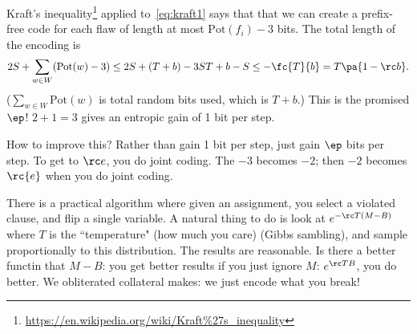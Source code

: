Kraft's inequality\footnote{\url{https://en.wikipedia.org/wiki/Kraft\%27s_inequality}} applied to~\eqref{eq:kraft1} says that that we can create a prefix-free code for each flaw of length at most $\text{Pot}(f_i)-3$ bits. The total length of the encoding is
\[
2S + \sum_{w\in W} (\text{Pot}(w)-3) \le 2S+(T+b)-3S
T+b-S \le -\fc{T}{b} = T\pa{1-\rc b}.
\]
($\sum_{w\in W}\text{Pot}(w)$ is total random bits used, which is $T+b$.)
This is the promised $\ep$! $2+1=3$ gives an entropic gain of 1 bit per step.


How to improve this? Rather than gain 1 bit per step, just gain $\ep$ bits per step. To get to $\rc e$, you do joint coding. The $-3$ becomes $-2$; then $-2$ becomes $\rc{e}$ when you do joint coding.

There is a practical algorithm where given an assignment, you select a violated clause, and flip a single variable. A natural thing to do is look at $e^{-\rc T(M-B)}$ where $T$ is the ``temperature" (how much you care) (Gibbs sambling), and sample proportionally to this distribution. 
The results are reasonable. Is there a better functin that $M-B$: you get better results if you just ignore $M$: $e^{\rc T B}$, you do better. We obliterated collateral makes: we just encode what you break!

